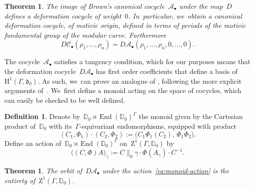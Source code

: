 \documentclass[JEP,XML,SOM,Unicode,published]{cedram}
\let\oldbullet\bullet
\renewcommand{\bullet}{{\scriptscriptstyle\oldbullet}}
\theoremstyle{plain}
\newtheorem{theorem}[theoremcounter]{Theorem}
\theoremstyle{definition}
\newtheorem{definition}[theoremcounter]{Definition}
\newcommand{\tx}{\text}
\newcommand{\nbd}{\nobreakdash-\hspace{0pt}}
\newcommand{\bbD}{\ensuremath{\mathbb{D}}}
\newcommand{\cA}{\ensuremath{\mathcal{A}}}
\newcommand{\cC}{\ensuremath{\mathcal{C}}}
\newcommand{\frakd}{\ensuremath{\mathfrak{d}}}
\newcommand{\rmH}{\ensuremath{\mathrm{H}}}
\newcommand{\rmZ}{\ensuremath{\mathrm{Z}}}
\newcommand{\defeq}{:=}
\let\Ga\Gamma
\let\ga\gamma
\DeclareMathOperator{\End}{End}
\begin{document}
\begin{theorem}
\label{thm:true-canonical-cocycle}
The image of Brown's canonical cocycle~$\cA_\bullet$ under the map~$D$ defines a deformation cocycle of weight~$0$. In~particular, we~obtain a canonical deformation cocycle, of motivic origin, defined in terms of periods of the motivic fundamental group of the modular curve. Furthermore
\begin{equation*}
D\cC_\bullet(\rho_1,\ldots,\rho_n)
=
D\cA_\bullet(\rho_1,\ldots,\rho_n,0,\ldots,0)
\tx{.}
\end{equation*}
\end{theorem}

The cocycle~$\cA_\bullet$ satisfies a tangency condition, which for our purposes means that the deformation cocycle~$D\cA_\bullet$ has first order coefficients that define a basis of~$\rmH^1(\Ga,\frakd_0)$. As such, we~can prove an analogue of \cite[Cor.\,11.7]{brown17}, following the more explicit arguments of~\cite{brown14}. We~first define a monoid acting on the space of cocycles, which can easily be checked to be well defined.

\begin{definition}
\label{def:endomorphism-group}
Denote by~$\bbD_0\rtimes \End(\bbD_0)^\Ga$ the monoid given by the Cartesian product of~$\bbD_0$ with its~$\Ga$\nbd{}equivariant endomorphisms, equipped with product
\begin{equation*}
(C_1,\Phi_1)\cdot(C_2,\Phi_2)
\defeq
\bigl(C_1\Phi_1(C_2),\, \Phi_1\Phi_2 \bigr)
\tx{.}
\end{equation*}
Define an action of~$\bbD_0\rtimes \End(\bbD_0)^\Ga$ on~$\rmZ^1(\Ga,\bbD_0)$ by
\begin{equation}
\label{eq:monoid-action}
\bigl((C,\Phi) A \bigr)_\ga
\defeq
C\big\|_0\ga\cdot \Phi(A_\ga)\cdot C^{-1}
\tx{.}
\end{equation}
\end{definition}

\skpt
\begin{theorem}
\label{thm:transitive-action}
The orbit of\/~$D\cA_\bullet$ under the action~\eqref{eq:monoid-action} is the entirety of\/~$\rmZ^1(\Ga,\bbD_0)$.
\end{theorem}
\end{document}
